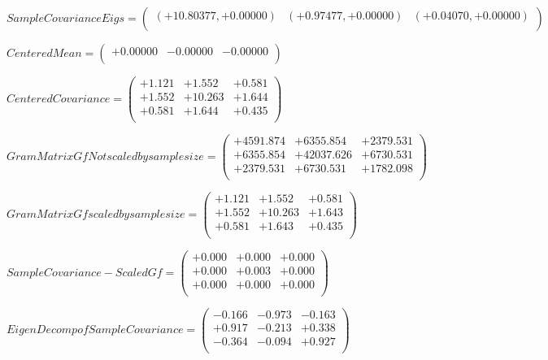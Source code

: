 \documentclass[9pt]{article}
\theoremstyle{plain}
\theoremstyle{definition}
\theoremstyle{remark}
\numberwithin{equation}{section}
\begin{document}
$Sample Covariance Eigs = \left(
\begin{array}{
ccc}
(+10.80377,+0.00000) & (+0.97477,+0.00000) & (+0.04070,+0.00000) \\
\end{array}
\right)$ \newline 

$Centered Mean = \left(
\begin{array}{
ccc}
+0.00000 & -0.00000 & -0.00000 \\
\end{array}
\right)$ \newline 

$Centered Covariance = \left(
\begin{array}{
ccc}
+1.121 & +1.552 & +0.581 \\
+1.552 & +10.263 & +1.644 \\
+0.581 & +1.644 & +0.435 \\
\end{array}
\right)$ \newline 

$Gram Matrix Gf Not scaled by sample size = \left(
\begin{array}{
ccc}
+4591.874 & +6355.854 & +2379.531 \\
+6355.854 & +42037.626 & +6730.531 \\
+2379.531 & +6730.531 & +1782.098 \\
\end{array}
\right)$ \newline 

$Gram Matrix Gf  scaled by sample size = \left(
\begin{array}{
ccc}
+1.121 & +1.552 & +0.581 \\
+1.552 & +10.263 & +1.643 \\
+0.581 & +1.643 & +0.435 \\
\end{array}
\right)$ \newline 

$SampleCovariance - Scaled Gf = \left(
\begin{array}{
ccc}
+0.000 & +0.000 & +0.000 \\
+0.000 & +0.003 & +0.000 \\
+0.000 & +0.000 & +0.000 \\
\end{array}
\right)$ \newline 

$EigenDecomp of SampleCovariance = \left(
\begin{array}{
ccc}
-0.166 & -0.973 & -0.163 \\
+0.917 & -0.213 & +0.338 \\
-0.364 & -0.094 & +0.927 \\
\end{array}
\right)$ \newline 
\end{document}
